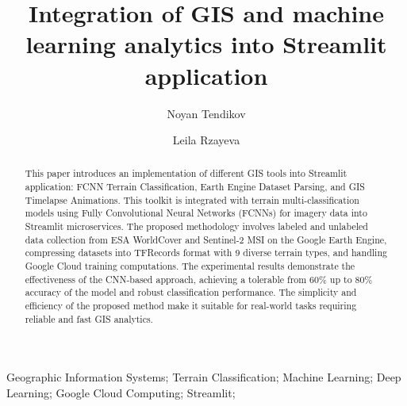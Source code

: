 \documentclass[3p,times,procedia]{elsarticle}
\begin{document}
\begin{frontmatter}


\title{Integration of GIS and machine learning analytics into Streamlit application}

\author[a]{Noyan Tendikov} 
\author[b]{Leila Rzayeva}

\address[a]{Astana IT University, Mangilik El avenue 55/11, Astana, 010000, Kazakhstan}
\address[b]{Astana IT University, Mangilik El avenue 55/11, Astana, 010000, Kazakhstan}

\begin{abstract}
This paper introduces an implementation of different GIS tools into Streamlit application: FCNN Terrain Classification, Earth Engine Dataset Parsing, and GIS Timelapse Animations. This toolkit is integrated with terrain multi-classification models using Fully Convolutional Neural Networks (FCNNs) for imagery data into Streamlit microservices. The proposed methodology involves labeled and unlabeled data collection from ESA WorldCover and Sentinel-2 MSI on the Google Earth Engine, compressing datasets into TFRecords format with 9 diverse terrain types, and handling Google Cloud training computations. The experimental results demonstrate the effectiveness of the CNN-based approach, achieving a tolerable from 60\% up to 80\% accuracy of the model and robust classification performance. The simplicity and efficiency of the proposed method make it suitable for real-world tasks requiring reliable and fast GIS analytics.
\end{abstract}

\begin{keyword}
Geographic Information Systems; Terrain Classification; Machine Learning; Deep Learning; Google Cloud Computing; Streamlit;
\end{keyword}

\end{frontmatter}
\end{document}
